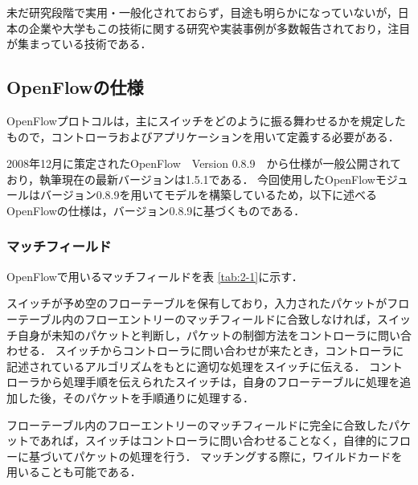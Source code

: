 未だ研究段階で実用・一般化されておらず，目途も明らかになっていないが，日本の企業や大学もこの技術に関する研究や実装事例が多数報告されており，注目が集まっている技術である．

\subsection{OpenFlowの仕様}

OpenFlowプロトコルは，主にスイッチをどのように振る舞わせるかを規定したもので，コントローラおよびアプリケーションを用いて定義する必要がある．

2008年12月に策定されたOpenFlow　Version 0.8.9\cite{openflow}　から仕様が一般公開されており，執筆現在の最新バージョンは1.5.1である．
今回使用したOpenFlowモジュールはバージョン0.8.9を用いてモデルを構築しているため，以下に述べるOpenFlowの仕様は，バージョン0.8.9に基づくものである．

\subsubsection{マッチフィールド}

OpenFlowで用いるマッチフィールドを表 \ref{tab:2-1}に示す\cite{openflow}．

スイッチが予め空のフローテーブルを保有しており，入力されたパケットがフローテーブル内のフローエントリーのマッチフィールドに合致しなければ，スイッチ自身が未知のパケットと判断し，パケットの制御方法をコントローラに問い合わせる．
スイッチからコントローラに問い合わせが来たとき，コントローラに記述されているアルゴリズムをもとに適切な処理をスイッチに伝える．
コントローラから処理手順を伝えられたスイッチは，自身のフローテーブルに処理を追加した後，そのパケットを手順通りに処理する．

フローテーブル内のフローエントリーのマッチフィールドに完全に合致したパケットであれば，スイッチはコントローラに問い合わせることなく，自律的にフローに基づいてパケットの処理を行う．
マッチングする際に，ワイルドカードを用いることも可能である．

